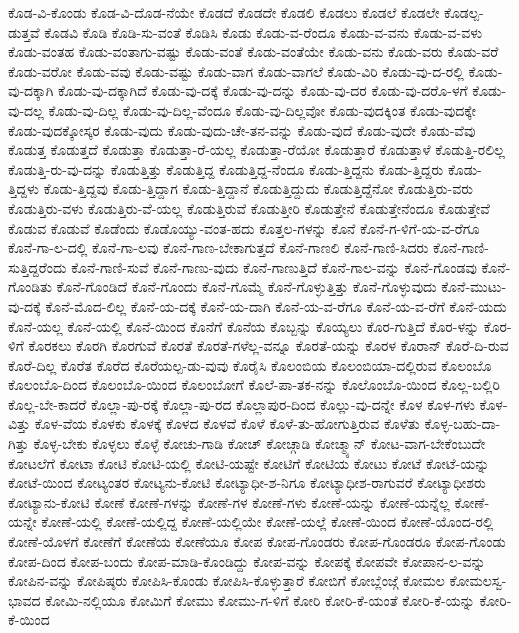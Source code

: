 {ಕೊಡ-ವಿ-ಕೊಂಡು
ಕೊಡ-ವಿ-ದೊಡ-ನೆಯೇ
ಕೊಡದೆ
ಕೊಡದೇ
ಕೊಡಲಿ
ಕೊಡಲು
ಕೊಡಲೆ
ಕೊಡಲೇ
ಕೊಡಲ್ಪ-ಡುತ್ತವೆ
ಕೊಡವಿ
ಕೊಡಿ
ಕೊಡಿ-ಸು-ವಂತೆ
ಕೊಡಿಸಿ
ಕೊಡು
ಕೊಡು-ವ-ರೆಂದೂ
ಕೊಡು-ವ-ವನು
ಕೊಡು-ವ-ವಳು
ಕೊಡು-ವಂತಹ
ಕೊಡು-ವಂತಾಗು-ವಷ್ಟು
ಕೊಡು-ವಂತೆ
ಕೊಡು-ವಂತೆಯೇ
ಕೊಡು-ವನು
ಕೊಡು-ವರು
ಕೊಡು-ವರೆ
ಕೊಡು-ವರೋ
ಕೊಡು-ವವು
ಕೊಡು-ವಷ್ಟು
ಕೊಡು-ವಾಗ
ಕೊಡು-ವಾಗಲೆ
ಕೊಡು-ವಿರಿ
ಕೊಡು-ವು-ದ-ರಲ್ಲಿ
ಕೊಡು-ವು-ದಕ್ಕಾಗಿ
ಕೊಡು-ವು-ದಕ್ಕಾಗಿದೆ
ಕೊಡು-ವು-ದಕ್ಕೆ
ಕೊಡು-ವು-ದನ್ನು
ಕೊಡು-ವು-ದರ
ಕೊಡು-ವು-ದರೊ-ಳಗೆ
ಕೊಡು-ವು-ದಲ್ಲ
ಕೊಡು-ವು-ದಿಲ್ಲ
ಕೊಡು-ವು-ದಿಲ್ಲ-ವೆಂದೂ
ಕೊಡು-ವು-ದಿಲ್ಲವೋ
ಕೊಡು-ವುದಕ್ಕಿಂತ
ಕೊಡು-ವುದಕ್ಕೇ
ಕೊಡು-ವುದಕ್ಕೋಸ್ಕರ
ಕೊಡು-ವುದು
ಕೊಡು-ವುದು-ಚೇ-ತನ-ವನ್ನು
ಕೊಡು-ವುದೆ
ಕೊಡು-ವುದೇ
ಕೊಡು-ವೆವು
ಕೊಡುತ್ತ
ಕೊಡುತ್ತದೆ
ಕೊಡುತ್ತಾ
ಕೊಡುತ್ತಾ-ರೆ-ಯಲ್ಲ
ಕೊಡುತ್ತಾ-ರೆಯೋ
ಕೊಡುತ್ತಾರೆ
ಕೊಡುತ್ತಾಳೆ
ಕೊಡುತ್ತಿ-ರಲಿಲ್ಲ
ಕೊಡುತ್ತಿ-ರು-ವು-ದನ್ನು
ಕೊಡುತ್ತಿತ್ತು
ಕೊಡುತ್ತಿದ್ದ
ಕೊಡುತ್ತಿದ್ದ-ನೆಂದೂ
ಕೊಡು-ತ್ತಿದ್ದನು
ಕೊಡು-ತ್ತಿದ್ದರು
ಕೊಡು-ತ್ತಿದ್ದಳು
ಕೊಡು-ತ್ತಿದ್ದವು
ಕೊಡು-ತ್ತಿದ್ದಾಗ
ಕೊಡು-ತ್ತಿದ್ದಾನೆ
ಕೊಡುತ್ತಿದ್ದುದು
ಕೊಡುತ್ತಿದ್ದೆನೋ
ಕೊಡುತ್ತಿರು-ವರು
ಕೊಡುತ್ತಿರು-ವಳು
ಕೊಡುತ್ತಿರು-ವೆ-ಯಲ್ಲ
ಕೊಡುತ್ತಿರುವೆ
ಕೊಡುತ್ತೀರಿ
ಕೊಡುತ್ತೇನೆ
ಕೊಡುತ್ತೇನೆಂದೂ
ಕೊಡುತ್ತೇವೆ
ಕೊಡುವ
ಕೊಡುವೆ
ಕೊಡೆಂದು
ಕೊಡೊಯ್ಯು-ವಂತ-ಹದು
ಕೊತ್ತಲ-ಗಳನ್ನು
ಕೊನೆ
ಕೊನೆ-ಗ-ಳಿಗೆ-ಯ-ವ-ರೆಗೂ
ಕೊನೆ-ಗಾ-ಲ-ದಲ್ಲಿ
ಕೊನೆ-ಗಾ-ಲವು
ಕೊನೆ-ಗಾಣ-ಬೇಕಾಗುತ್ತದೆ
ಕೊನೆ-ಗಾಣಲಿ
ಕೊನೆ-ಗಾಣಿ-ಸಿದರು
ಕೊನೆ-ಗಾಣಿ-ಸುತ್ತಿದ್ದರೆಂದು
ಕೊನೆ-ಗಾಣಿ-ಸುವೆ
ಕೊನೆ-ಗಾಣು-ವುದು
ಕೊನೆ-ಗಾಣುತ್ತಿದೆ
ಕೊನೆ-ಗಾಲ-ವನ್ನು
ಕೊನೆ-ಗೊಂಡವು
ಕೊನೆ-ಗೊಂಡಿತು
ಕೊನೆ-ಗೊಂಡಿದೆ
ಕೊನೆ-ಗೊಂದು
ಕೊನೆ-ಗೊಮ್ಮೆ
ಕೊನೆ-ಗೊಳ್ಳುತ್ತಿತ್ತು
ಕೊನೆ-ಗೊಳ್ಳುವುದು
ಕೊನೆ-ಮುಟು-ವು-ದಕ್ಕೆ
ಕೊನೆ-ಮೊದ-ಲಿಲ್ಲ
ಕೊನೆ-ಯ-ದಕ್ಕೆ
ಕೊನೆ-ಯ-ದಾಗಿ
ಕೊನೆ-ಯ-ವ-ರೆಗೂ
ಕೊನೆ-ಯ-ವ-ರೆಗೆ
ಕೊನೆ-ಯದು
ಕೊನೆ-ಯಲ್ಲ
ಕೊನೆ-ಯಲ್ಲಿ
ಕೊನೆ-ಯಿಂದ
ಕೊನೆಗೆ
ಕೊನೆಯ
ಕೊಬ್ಬನ್ನು
ಕೊಯ್ಯಲು
ಕೊರ-ಗುತ್ತಿದೆ
ಕೊರ-ಳನ್ನು
ಕೊರ-ಳಿಗೆ
ಕೊರಕಲು
ಕೊರಗಿ
ಕೊರಗುವೆ
ಕೊರತೆ
ಕೊರತೆ-ಗಳೆಲ್ಲ-ವನ್ನೂ
ಕೊರತೆ-ಯನ್ನು
ಕೊರಳ
ಕೊರಾನ್
ಕೊರೆ-ದಿ-ರುವ
ಕೊರೆ-ದಿಲ್ಲ
ಕೊರೆತ
ಕೊರೆದ
ಕೊರೆಯಲ್ಪ-ಡು-ವುವು
ಕೊರೈಸಿ
ಕೊಲಂಬಿಯ
ಕೊಲಂಬಿಯಾ-ದಲ್ಲಿರುವ
ಕೊಲಂಬೊ
ಕೊಲಂಬೊ-ದಿಂದ
ಕೊಲಂಬೊ-ಯಿಂದ
ಕೊಲಂಬೋಗೆ
ಕೊಲೆ-ಪಾ-ತಕ-ನನ್ನು
ಕೊಲೊಂಬೊ-ಯಿಂದ
ಕೊಲ್ಲ-ಬಲ್ಲಿರಿ
ಕೊಲ್ಲ-ಬೇ-ಕಾದರೆ
ಕೊಲ್ಲಾ-ಪು-ರಕ್ಕೆ
ಕೊಲ್ಲಾ-ಪು-ರದ
ಕೊಲ್ಲಾಪುರ-ದಿಂದ
ಕೊಲ್ಲು-ವು-ದನ್ನೇ
ಕೊಳ
ಕೊಳ-ಗಳು
ಕೊಳ-ವಿತ್ತು
ಕೊಳ-ವೆಯ
ಕೊಳಕು
ಕೊಳಕ್ಕೆ
ಕೊಳದ
ಕೊಳವೆ
ಕೊಳೆ
ಕೊಳೆ-ತು-ಹೋಗುತ್ತಿರುವ
ಕೊಳೆತು
ಕೊಳ್ಳ-ಬಹು-ದಾ-ಗಿತ್ತು
ಕೊಳ್ಳ-ಬೇಕು
ಕೊಳ್ಳಲು
ಕೊಳ್ಳೆ
ಕೋಚು-ಗಾಡಿ
ಕೋಚ್
ಕೋಚ್ಗಾಡಿ
ಕೋಚ್ಮ್ಯಾನ್
ಕೋಟ-ವಾಗ-ಬೇಕೆಂಬುದೇ
ಕೋಟಲೆಗೆ
ಕೋಟಾ
ಕೋಟಿ
ಕೋಟಿ-ಯಲ್ಲಿ
ಕೋಟಿ-ಯಷ್ಟೇ
ಕೋಟಿಗೆ
ಕೋಟಿಯ
ಕೋಟು
ಕೋಟೆ
ಕೋಟೆ-ಯನ್ನು
ಕೋಟೆ-ಯಿಂದ
ಕೋಟ್ಯಂತರ
ಕೋಟ್ಯನು-ಕೋಟಿ
ಕೋಟ್ಯಾಧೀ-ಶ-ನಿಗೂ
ಕೋಟ್ಯಾಧೀಶ-ರಾಗುವರೆ
ಕೋಟ್ಯಾಧೀಶರು
ಕೋಟ್ಯಾನು-ಕೋಟಿ
ಕೋಣೆ
ಕೋಣೆ-ಗಳನ್ನು
ಕೋಣೆ-ಗಳ
ಕೋಣೆ-ಗಳು
ಕೋಣೆ-ಯನ್ನು
ಕೋಣೆ-ಯನ್ನೆಲ್ಲ
ಕೋಣೆ-ಯನ್ನೇ
ಕೋಣೆ-ಯಲ್ಲಿ
ಕೋಣೆ-ಯಲ್ಲಿದ್ದ
ಕೋಣೆ-ಯಲ್ಲಿಯೇ
ಕೋಣೆ-ಯಲ್ಲೆ
ಕೋಣೆ-ಯಿಂದ
ಕೋಣೆ-ಯೊಂದ-ರಲ್ಲಿ
ಕೋಣೆ-ಯೊಳಗೆ
ಕೋಣೆಗೆ
ಕೋಣೆಯ
ಕೋಣೆಯೂ
ಕೋಪ
ಕೋಪ-ಗೊಂಡರು
ಕೋಪ-ಗೊಂಡರೂ
ಕೋಪ-ಗೊಂಡು
ಕೋಪ-ದಿಂದ
ಕೋಪ-ಬಂದು
ಕೋಪ-ಮಾಡಿ-ಕೊಂಡಿದ್ದು
ಕೋಪ-ವನ್ನು
ಕೋಪಕ್ಕೆ
ಕೋಪವೇ
ಕೋಪಾನ-ಲ-ವನ್ನು
ಕೋಪಿನ-ವನ್ನು
ಕೋಪಿಷ್ಠರು
ಕೋಪಿಸಿ-ಕೊಂಡು
ಕೋಪಿಸಿ-ಕೊಳ್ಳುತ್ತಾರೆ
ಕೋಬಿಗೆ
ಕೋಬ್ಲೆಂಜ್ಗೆ
ಕೋಮಲ
ಕೋಮಲಸ್ವ-ಭಾವದ
ಕೋಮಿ-ನಲ್ಲಿಯೂ
ಕೋಮಿಗೆ
ಕೋಮು
ಕೋಮು-ಗ-ಳಿಗೆ
ಕೋರಿ
ಕೋರಿ-ಕೆ-ಯಂತೆ
ಕೋರಿ-ಕೆ-ಯನ್ನು
ಕೋರಿ-ಕೆ-ಯಿಂದ
}
